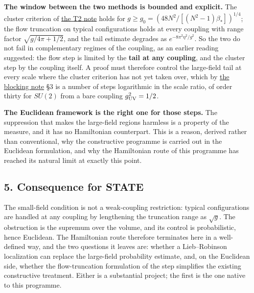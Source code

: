 \documentclass[11pt,a4paper]{article}
\begin{document}
\textbf{The window between the two methods is bounded and explicit.} The
cluster criterion of \href{strong-coupling-uniform-gap.md}{the T2 note}
holds for \(g\ge g_0=(48N^2/[(N^2-1)\beta_*])^{1/4}\); the flow
truncation on typical configurations holds at every coupling with range
factor \(\sqrt{g/4\pi+1/2}\), and the tail estimate degrades as
\(e^{-8\pi^2\eta^2/g^2}\). So the two do not fail in complementary
regimes of the coupling, as an earlier reading suggested: the flow step
is limited by the \textbf{tail at any coupling}, and the cluster step by
the coupling itself. A proof must therefore control the large-field tail
at every scale where the cluster criterion has not yet taken over, which
by \href{blocking-criterion-monotone.md}{the blocking note} §3 is a
number of steps logarithmic in the scale ratio, of order thirty for
\(SU(2)\) from a bare coupling \(g_{\rm UV}^2=1/2\).

\textbf{The Euclidean framework is the right one for those steps.} The
suppression that makes the large-field regions harmless is a property of
the measure, and it has no Hamiltonian counterpart. This is a reason,
derived rather than conventional, why the constructive programme is
carried out in the Euclidean formulation, and why the Hamiltonian route
of this programme has reached its natural limit at exactly this point.

\hypertarget{consequence-for-state}{%
\subsection{5. Consequence for STATE}\label{consequence-for-state}}

The small-field condition is not a weak-coupling restriction: typical
configurations are handled at any coupling by lengthening the truncation
range as \(\sqrt g\). The obstruction is the supremum over the volume,
and its control is probabilistic, hence Euclidean. The Hamiltonian route
therefore terminates here in a well-defined way, and the two questions
it leaves are: whether a Lieb--Robinson localization can replace the
large-field probability estimate, and, on the Euclidean side, whether
the flow-truncation formulation of the step simplifies the existing
constructive treatment. Either is a substantial project; the first is
the one native to this programme.
\end{document}
